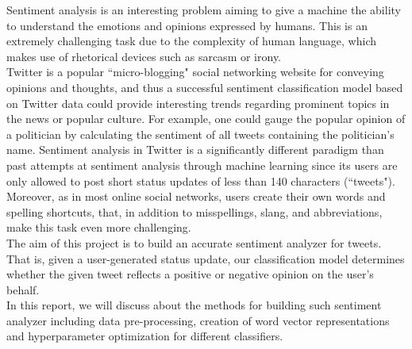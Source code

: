 Sentiment analysis is an interesting problem aiming to give a machine the ability to understand the emotions and opinions expressed by humans. This is an extremely challenging task due to the complexity of human language, which makes use of rhetorical devices such as sarcasm or irony.\\
Twitter is a popular ``micro-blogging" social networking website for conveying opinions and thoughts, and thus a successful sentiment classification model based on Twitter data could provide interesting trends regarding prominent topics in the news or popular culture. For example, one could gauge the popular opinion of a politician by calculating the sentiment of all tweets containing the politician's name. Sentiment analysis in Twitter is a significantly different paradigm than past attempts at sentiment analysis through machine learning since its users are only allowed to post short status updates of less than 140 characters (``tweets"). Moreover, as in most online social networks, users create their own words and spelling shortcuts, that, in addition to misspellings, slang, and abbreviations, make this task even more challenging.\\
The aim of this project is to build an accurate sentiment analyzer for tweets. 
That is, given a user-generated status update, our classification model determines whether the given tweet reflects a positive or negative opinion on the user’s behalf.\\
In this report, we will discuss about the methods for building such sentiment analyzer including data pre-processing, creation of word vector representations and hyperparameter optimization for different classifiers.